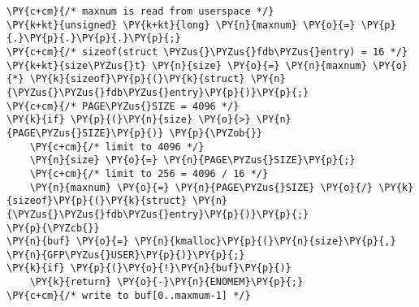 \begin{Verbatim}[commandchars=\\\{\}]
\PY{c+cm}{/* maxnum is read from userspace */}
\PY{k+kt}{unsigned} \PY{k+kt}{long} \PY{n}{maxnum} \PY{o}{=} \PY{p}{.}\PY{p}{.}\PY{p}{.}\PY{p}{;}
\PY{c+cm}{/* sizeof(struct \PYZus{}\PYZus{}fdb\PYZus{}entry) = 16 */}
\PY{k+kt}{size\PYZus{}t} \PY{n}{size} \PY{o}{=} \PY{n}{maxnum} \PY{o}{*} \PY{k}{sizeof}\PY{p}{(}\PY{k}{struct} \PY{n}{\PYZus{}\PYZus{}fdb\PYZus{}entry}\PY{p}{)}\PY{p}{;}
\PY{c+cm}{/* PAGE\PYZus{}SIZE = 4096 */}
\PY{k}{if} \PY{p}{(}\PY{n}{size} \PY{o}{>} \PY{n}{PAGE\PYZus{}SIZE}\PY{p}{)} \PY{p}{\PYZob{}}
    \PY{c+cm}{/* limit to 4096 */}
    \PY{n}{size} \PY{o}{=} \PY{n}{PAGE\PYZus{}SIZE}\PY{p}{;}
    \PY{c+cm}{/* limit to 256 = 4096 / 16 */}
    \PY{n}{maxnum} \PY{o}{=} \PY{n}{PAGE\PYZus{}SIZE} \PY{o}{/} \PY{k}{sizeof}\PY{p}{(}\PY{k}{struct} \PY{n}{\PYZus{}\PYZus{}fdb\PYZus{}entry}\PY{p}{)}\PY{p}{;}
\PY{p}{\PYZcb{}}
\PY{n}{buf} \PY{o}{=} \PY{n}{kmalloc}\PY{p}{(}\PY{n}{size}\PY{p}{,} \PY{n}{GFP\PYZus{}USER}\PY{p}{)}\PY{p}{;}
\PY{k}{if} \PY{p}{(}\PY{o}{!}\PY{n}{buf}\PY{p}{)}
    \PY{k}{return} \PY{o}{-}\PY{n}{ENOMEM}\PY{p}{;}
\PY{c+cm}{/* write to buf[0..maxmum-1] */}
\end{Verbatim}
